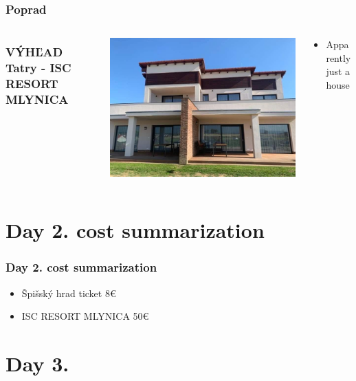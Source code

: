 \documentclass{beamer}
\begin{document}
	\begin{frame}
		\frametitle{Poprad}

		\begin{columns}
			\frametitle{VÝHĽAD Tatry - ISC RESORT MLYNICA}
			\begin{column}{0.5\textwidth}
				\includegraphics[width=\textwidth]{day2/hotel}
			\end{column}
			\begin{column}{0.5\textwidth}
				\begin{itemize}
					\item Apparently just a house
				\end{itemize}
			\end{column}
		\end{columns}
	\end{frame}

	\section{Day 2. cost summarization}

	\begin{frame}
		\frametitle{Day 2. cost summarization}

		\begin{itemize}
			\item Špišský hrad ticket 8€
			\item ISC RESORT MLYNICA 50€
		\end{itemize}
	\end{frame}

	\section{Day 3.}
\end{document}
